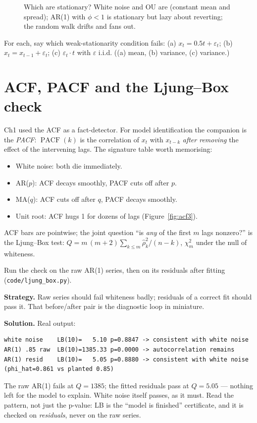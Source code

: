 \begin{figure}[ht]\centering

\caption{Which are stationary? White noise and OU are (constant mean
and spread); AR(1) with $\phi<1$ is stationary but lazy about
reverting; the random walk drifts and fans out.}
\label{fig:tsgrid}
\end{figure}

\begin{checkpoint}
For each, say which weak-stationarity condition fails: (a)
$x_t=0.5t+\varepsilon_t$; (b) $x_t=x_{t-1}+\varepsilon_t$; (c)
$\varepsilon_t\cdot t$ with $\varepsilon$ i.i.d. ((a) mean, (b)
variance, (c) variance.)
\end{checkpoint}

\section{ACF, PACF and the Ljung--Box check}\label{sec:acfpacf}
Ch1 used the ACF as a fact-detector. For model identification the
companion is the \emph{PACF}: $\operatorname{PACF}(k)$ is the
correlation of $x_t$ with $x_{t-k}$ \emph{after removing} the effect
of the intervening lags. The signature table worth memorising:
\begin{itemize}
\item White noise: both die immediately.
\item AR($p$): ACF decays smoothly, PACF cuts off after $p$.
\item MA($q$): ACF cuts off after $q$, PACF decays smoothly.
\item Unit root: ACF hugs 1 for dozens of lags
(Figure~\ref{fig:acf3}).
\end{itemize}
ACF bars are pointwise; the joint question ``is \emph{any} of the
first $m$ lags nonzero?'' is the Ljung--Box test:
$Q=m\,(m+2)\sum_{k\le m}\hat\rho_k^2/(n-k)$, $\chi^2_m$ under the
null of whiteness.

\begin{example}\label{ex:lb}
Run the check on the raw AR(1) series, then on its residuals after
fitting (\texttt{code/ljung\_box.py}).

\textbf{Strategy.} Raw series should fail whiteness badly; residuals
of a correct fit should pass it. That before/after pair is the
diagnostic loop in miniature.

\textbf{Solution.} Real output:
\begin{lstlisting}[numbers=none]
white noise    LB(10)=   5.10 p=0.8847 -> consistent with white noise
AR(1) .85 raw  LB(10)=1385.33 p=0.0000 -> autocorrelation remains
AR(1) resid    LB(10)=   5.05 p=0.8880 -> consistent with white noise
(phi_hat=0.861 vs planted 0.85)
\end{lstlisting}
The raw AR(1) fails at $Q=1385$; the fitted residuals pass at
$Q=5.05$ --- nothing left for the model to explain. White noise
itself passes, as it must. Read the pattern, not just the p-value:
LB is the ``model is finished'' certificate, and it is checked on
\emph{residuals}, never on the raw series.
\end{example}


